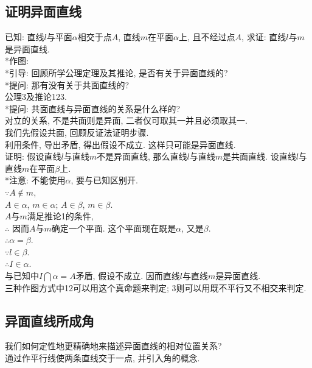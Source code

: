 \documentclass{article}
\begin{document}
\begin{CJK}{UTF8}{gkai}
\subsection{证明异面直线}
已知: 直线$l$与平面$\alpha$相交于点$A$, 直线$m$在平面$\alpha$上, 且不经过点$A$, 求证: 直线$l$与$m$是异面直线.\\
*作图: \\
*引导: 回顾所学公理定理及其推论, 是否有关于异面直线的?\\
*提问: 那有没有关于共面直线的?\\
公理3及推论123.\\
*提问: 共面直线与异面直线的关系是什么样的?\\
对立的关系, 不是共面则是异面, 二者仅可取其一并且必须取其一.\\
我们先假设共面, 回顾反证法证明步骤.\\
利用条件, 导出矛盾, 得出假设不成立. 这样只可能是异面直线.\\
证明: 假设直线$l$与直线$m$不是异面直线, 那么直线$l$与直线$m$是共面直线. 设直线$l$与直线$m$在平面$\beta$上.\\
*注意: 不能使用$\alpha$, 要与已知区别开.\\
$\because A \notin m$,\\
$A \in \alpha$, $m \in \alpha$; $A \in \beta$, $m \in \beta$.\\
$A$与$m$满足推论1的条件, \\
$\therefore$ 因而$A$与$m$确定一个平面. 这个平面现在既是$\alpha$, 又是$\beta$.\\
$\therefore \alpha = \beta$.\\
$\because l \in \beta$.\\
$\therefore I \in \alpha$.\\
与已知中$I \bigcap \alpha = A$矛盾, 假设不成立. 因而直线$l$与直线$m$是异面直线.\\
\newline
三种作图方式中12可以用这个真命题来判定; 3则可以用既不平行又不相交来判定.

\subsection{异面直线所成角}
我们如何定性地更精确地来描述异面直线的相对位置关系?\\
通过作平行线使两条直线交于一点, 并引入角的概念.

\end{CJK}
\end{document}
